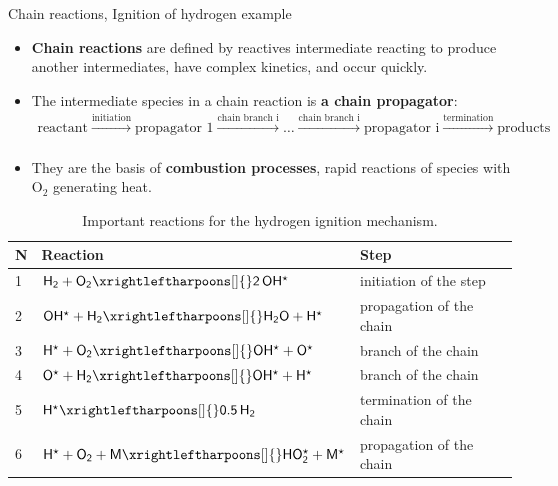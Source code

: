 \begin{frame}[<+->]{Chain reactions, Ignition of hydrogen example}
	\small
	\begin{itemize}
		\item \alert{\bf Chain reactions} are defined by reactives intermediate reacting to produce another intermediates, 
		have complex kinetics, and occur quickly.
		\item The intermediate species in a chain reaction is \alert{\bf a chain propagator}:
		\begin{multline*}
			\mbox{reactant} \xrightarrow[]{\text{initiation}} \mbox{propagator 1} \xrightarrow[]{\text{chain branch i}} \ldots
			\xrightarrow[]{\text{chain branch i}} \mbox{propagator i} \xrightarrow[]{\text{termination}} \mbox{products} 
		\end{multline*}
		\item They are the basis of \alert{\bf combustion processes}, rapid reactions of species with O$_2$ generating heat. 
	\end{itemize}
	\begin{table}
		\begin{tabular*}{1\textwidth}{@{\extracolsep{\fill}}lll}
			\toprule 
			N & Reaction & Step \\[-5pt]
			\midrule 
			1 & $\mathsf{H_2 + O_2 \xrightleftharpoons[]{} 2\, OH^\star}$ &	initiation of the step \\[-3pt]
			2 & $\mathsf{OH^\star + H_2 \xrightleftharpoons[]{} H_2O + H^\star}$ &	propagation of the chain \\[-3pt]
			3 & $\mathsf{H^\star + O_2 \xrightleftharpoons[]{} OH^\star + O^\star}$ & branch of the chain \\[-3pt]
			4 & $\mathsf{O^\star + H_2 \xrightleftharpoons[]{} OH^\star + H^\star}$ & branch of the chain  \\[-3pt]
			5 & $\mathsf{H^\star \xrightleftharpoons[]{} 0.5 \, H_2}$ &	termination of the chain \\[-3pt]
			6 & $\mathsf{H^\star + O_2 + M \xrightleftharpoons[]{} HO_2^\star +M^\star }$ & propagation of the chain \\[-3pt]
			\bottomrule
		\end{tabular*}
		\caption{Important reactions for the hydrogen ignition mechanism.}
	\end{table}
\end{frame}
%
